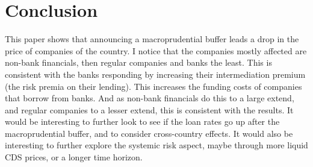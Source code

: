 \documentclass[11pt]{article}
\newcommand\fnote[1]{\captionsetup{font=small}\caption*{#1}}
\begin{document}
\iffalse
\begin{figure}%
	\centering
	\includegraphics%
	{./figures/retabncumTypeNoEvent.pdf}
	\caption{Cumulative Abnormal Returns - Bank and non-bank finance split - No Event}
	\label{fig:eventAbnNoEventSplit}
	\fnote{True means in bank industry group, Non-bank fin means in an industry sector group, which is not banking according to the the Global Industry Classification Standard, and all else are in other. Cumulated using sums. No event means an announcement of no change to the macroprudential buffer. Blue line and grey area denotes fit and 90\% confidence bands using the Loess method. Triangles signify daily means.}
\end{figure}
\fi



\iffalse
\subsection{Robustness Checks}

Robust to computing CAR using cumulative product instead of cumulative sums, as the results look almost identical, as can be seen from figure \ref{fig:eventAbnCump}.



\begin{figure}%
	\centering
	\includegraphics%
	{./figures/retabncum.pdf}
	\caption{Cumulative Abnormal Returns - Event}
	\label{fig:eventAbnCump}
	\fnote{Cumulated using products. Event means an increase in the macroprudential buffer of 0.5 percentage point or higher. Blue line and grey area denotes fit and 90\% confidence bands using the Loess method. Triangles signify daily means.}
\end{figure}
\fi

\section{Conclusion} \label{sec:conclusion}
This paper shows that announcing a macroprudential buffer leads a drop in the price of companies of the country. I notice that the companies mostly affected are non-bank financials, then regular companies and banks the least. This is consistent with the banks responding by increasing their intermediation premium (the risk premia on their lending). This increases the funding costs of companies that borrow from banks. And as non-bank financials do this to a large extend, and regular companies to a lesser extend, this is consistent with the results. It would be interesting to further look to see if the loan rates go up after the macroprudential buffer, and to consider cross-country effects. It would also be interesting to further explore the systemic risk aspect, maybe through more liquid CDS prices, or a longer time horizon.
\end{document}
